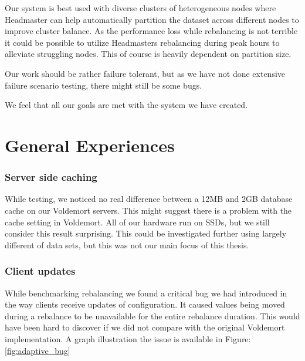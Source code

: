 Our system is best used with diverse clusters of heterogeneous nodes where Headmaster can help automatically partition the dataset across different nodes to improve cluster balance. As the performance loss while rebalancing is not terrible it could be possible to utilize Headmasters rebalancing during peak hours to alleviate struggling nodes. This of course is heavily dependent on partition size. 

Our work should be rather failure tolerant, but as we have not done extensive failure scenario testing, there might still be some bugs. 

We feel that all our goals are met with the system we have created.

\section{General Experiences}

\subsubsection{Server side caching}
While testing, we noticed no real difference between a 12MB and 2GB database cache on our Voldemort servers. This might suggest there is a problem with the cache setting in Voldemort. All of our hardware run on SSDs, but we still consider this result surprising. This could be investigated further using largely different of data sets, but this was not our main focus of this thesis.

\subsubsection{Client updates}
While benchmarking rebalancing we found a critical bug we had introduced in the way clients receive updates of configuration. It caused values being moved during a rebalance to be unavailable for the entire rebalance duration. This would have been hard to discover if we did not compare with the original Voldemort implementation. A graph illustration the issue is available in Figure: \ref{fig:adaptive_bug}

